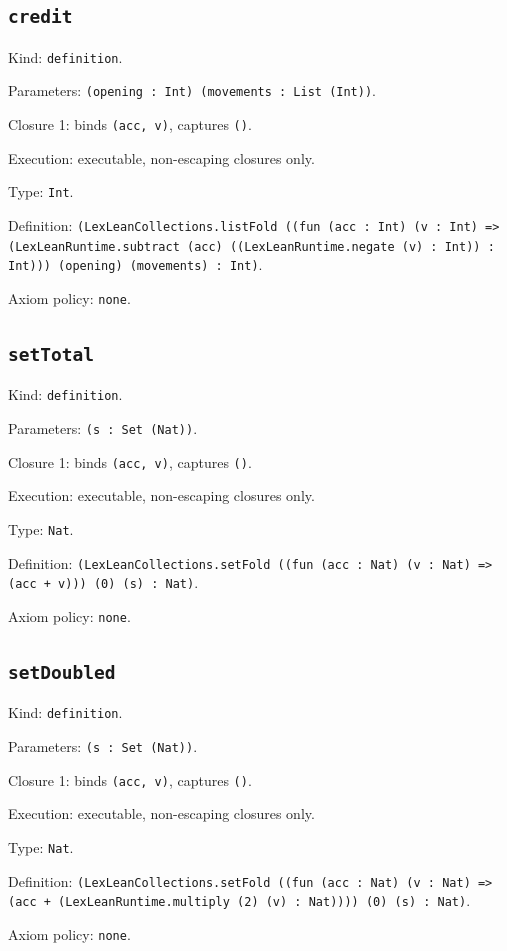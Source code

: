 \documentclass[11pt]{article}
\begin{document}
\subsection*{\texttt{credit}}
\noindent Kind: \texttt{definition}.\par
\noindent Parameters: \texttt{(opening : Int) (movements : List (Int))}.\par
\noindent Closure 1: binds \texttt{(acc, v)}, captures \texttt{()}.\par
\noindent Execution: executable, non-escaping closures only.\par
\noindent Type: \texttt{Int}.\par
\noindent Definition: \texttt{(LexLeanCollections.listFold ((fun (acc : Int) (v : Int) => (LexLeanRuntime.subtract (acc) ((LexLeanRuntime.negate (v) : Int)) : Int))) (opening) (movements) : Int)}.\par
\noindent Axiom policy: \texttt{none}.\par
\subsection*{\texttt{setTotal}}
\noindent Kind: \texttt{definition}.\par
\noindent Parameters: \texttt{(s : Set (Nat))}.\par
\noindent Closure 1: binds \texttt{(acc, v)}, captures \texttt{()}.\par
\noindent Execution: executable, non-escaping closures only.\par
\noindent Type: \texttt{Nat}.\par
\noindent Definition: \texttt{(LexLeanCollections.setFold ((fun (acc : Nat) (v : Nat) => (acc + v))) (0) (s) : Nat)}.\par
\noindent Axiom policy: \texttt{none}.\par
\subsection*{\texttt{setDoubled}}
\noindent Kind: \texttt{definition}.\par
\noindent Parameters: \texttt{(s : Set (Nat))}.\par
\noindent Closure 1: binds \texttt{(acc, v)}, captures \texttt{()}.\par
\noindent Execution: executable, non-escaping closures only.\par
\noindent Type: \texttt{Nat}.\par
\noindent Definition: \texttt{(LexLeanCollections.setFold ((fun (acc : Nat) (v : Nat) => (acc + (LexLeanRuntime.multiply (2) (v) : Nat)))) (0) (s) : Nat)}.\par
\noindent Axiom policy: \texttt{none}.\par
\end{document}
